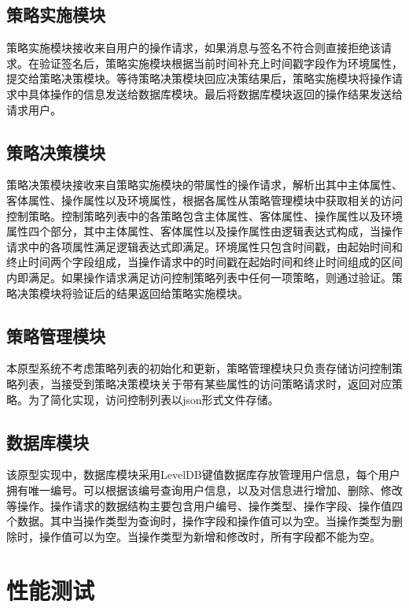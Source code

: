 \subsection{策略实施模块}

策略实施模块接收来自用户的操作请求，如果消息与签名不符合则直接拒绝该请求。在验证签名后，策略实施模块根据当前时间补充上时间戳字段作为环境属性，提交给策略决策模块。等待策略决策模块回应决策结果后，策略实施模块将操作请求中具体操作的信息发送给数据库模块。最后将数据库模块返回的操作结果发送给请求用户。

\subsection{策略决策模块}

策略决策模块接收来自策略实施模块的带属性的操作请求，解析出其中主体属性、客体属性、操作属性以及环境属性，根据各属性从策略管理模块中获取相关的访问控制策略。控制策略列表中的各策略包含主体属性、客体属性、操作属性以及环境属性四个部分，其中主体属性、客体属性以及操作属性由逻辑表达式构成，当操作请求中的各项属性满足逻辑表达式即满足。环境属性只包含时间戳，由起始时间和终止时间两个字段组成，当操作请求中的时间戳在起始时间和终止时间组成的区间内即满足。如果操作请求满足访问控制策略列表中任何一项策略，则通过验证。策略决策模块将验证后的结果返回给策略实施模块。

\subsection{策略管理模块}

本原型系统不考虑策略列表的初始化和更新，策略管理模块只负责存储访问控制策略列表，当接受到策略决策模块关于带有某些属性的访问策略请求时，返回对应策略。为了简化实现，访问控制列表以json形式文件存储。

\subsection{数据库模块}

该原型实现中，数据库模块采用LevelDB键值数据库存放管理用户信息，每个用户拥有唯一编号。可以根据该编号查询用户信息，以及对信息进行增加、删除、修改等操作。操作请求的数据结构主要包含用户编号、操作类型、操作字段、操作值四个数据。其中当操作类型为查询时，操作字段和操作值可以为空。当操作类型为删除时，操作值可以为空。当操作类型为新增和修改时，所有字段都不能为空。

\section{性能测试}

